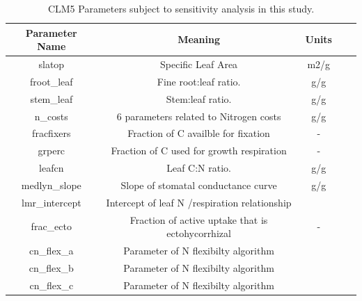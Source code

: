 \documentclass[draft,linenumbers]{agujournal}
\begin{document}
\nocite{*}

\clearpage


\pagebreak
\begin{table}
\begin{center}
\begin{tabular}{ |c|c|c|c|c| } 
 \hline
 Parameter Name & Meaning & Units \\
  \hline
 slatop & Specific Leaf Area & m2/g \\ 
 froot\_leaf & Fine root:leaf ratio. & g/g \\
 stem\_leaf  & Stem:leaf ratio. & g/g \\ 
 n\_costs    & 6 parameters related to Nitrogen costs & g/g \\
 fracfixers  & Fraction of C availble for fixation & - \\
  grperc  & Fraction of C used for growth respiration  & - \\
  leafcn  & Leaf C:N ratio. & g/g \\
     medlyn\_slope  & Slope of stomatal conductance curve & g/g \\
      lmr\_intercept & Intercept of leaf N /respiration relationship & \\
      frac\_ecto & Fraction of active uptake that is ectohycorrhizal & - \\
      cn\_flex\_a & Parameter of N flexibilty algorithm& \\
      cn\_flex\_b & Parameter of N flexibilty algorithm & \\
      cn\_flex\_c & Parameter of N flexibilty algorithm & \\
\hline
\end{tabular}
\end{center}
\caption{CLM5 Parameters subject to sensitivity analysis in this study. }
\label{table_parameters}
\end{table}
\end{document}

